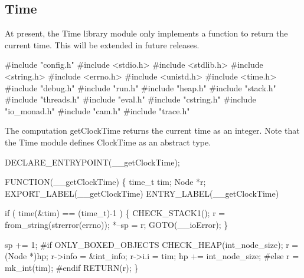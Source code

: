 %
%
\subsection{Time}
At present, the {\Tt{}Time\nwendquote} library module only implements a function to
return the current time. This will be extended in future releases.

\nwenddocs{}\endmoddef\nwstartdeflinemarkup{}\nwenddeflinemarkup
#include "config.h"
#include <stdio.h>
#include <stdlib.h>
#include <string.h>
#include <errno.h>
#include <unistd.h>
#include <time.h>
#include "debug.h"
#include "run.h"
#include "heap.h"
#include "stack.h"
#include "threads.h"
#include "eval.h"
#include "cstring.h"
#include "io_monad.h"
#include "cam.h"
#include "trace.h"

\nwendcode{}\nwdocspar
The computation {\Tt{}getClockTime\nwendquote} returns the current time as an
integer. Note that the {\Tt{}Time\nwendquote} module defines {\Tt{}ClockTime\nwendquote} as an
abstract type.

\nwenddocs{}\plusendmoddef\nwstartdeflinemarkup{}\nwenddeflinemarkup
DECLARE_ENTRYPOINT(__getClockTime);

FUNCTION(__getClockTime)
\{
    time_t tim;
    Node   *r;
    EXPORT_LABEL(__getClockTime)
 ENTRY_LABEL(__getClockTime)

    if ( time(&tim) == (time_t)-1 )
    \{
        CHECK_STACK1();
        r     = from_string(strerror(errno));
        *--sp = r;
        GOTO(__ioError);
    \}

    sp += 1;
#if ONLY_BOXED_OBJECTS
    CHECK_HEAP(int_node_size);
    r       = (Node *)hp;
    r->info = &int_info;
    r->i.i  = tim;
    hp     += int_node_size;
#else
    r = mk_int(tim);
#endif
    RETURN(r);
\}
\nwendcode{}

%


